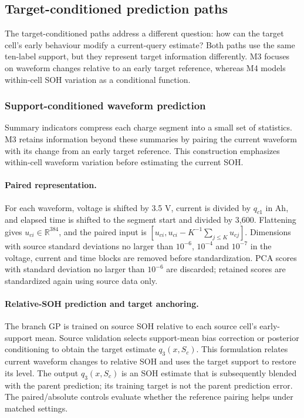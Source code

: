 \documentclass[preprint,12pt]{elsarticle}
\newcommand{\R}{\mathbb{R}}
\begin{document}
\subsection{Target-conditioned prediction paths}
The target-conditioned paths address a different question: how can the target cell's early behaviour modify a current-query estimate? Both paths use the same ten-label support, but they represent target information differently. M3 focuses on waveform changes relative to an early target reference, whereas M4 models within-cell SOH variation as a conditional function.
\subsubsection{Support-conditioned waveform prediction}
Summary indicators compress each charge segment into a small set of statistics. M3 retains information beyond these summaries by pairing the current waveform with its change from an early target reference. This construction emphasizes within-cell waveform variation before estimating the current SOH.

\paragraph{Paired representation.}
For each waveform, voltage is shifted by 3.5 V, current is divided by $q_{c1}$ in Ah, and elapsed time is shifted to the segment start and divided by 3,600. Flattening gives $u_{ci}\in\R^{384}$, and the paired input is $[u_{ci},u_{ci}-K^{-1}\sum_{j\leq K}u_{cj}]$. Dimensions with source standard deviations no larger than $10^{-6}$, $10^{-4}$ and $10^{-7}$ in the voltage, current and time blocks are removed before standardization. PCA scores with standard deviation no larger than $10^{-6}$ are discarded; retained scores are standardized again using source data only.

\paragraph{Relative-SOH prediction and target anchoring.}
The branch GP is trained on source SOH relative to each source cell's early-support mean. Source validation selects support-mean bias correction or posterior conditioning to obtain the target estimate $q_3(x,S_c)$. This formulation relates current waveform changes to relative SOH and uses the target support to restore its level. The output $q_3(x,S_c)$ is an SOH estimate that is subsequently blended with the parent prediction; its training target is not the parent prediction error. The paired/absolute controls evaluate whether the reference pairing helps under matched settings.
\end{document}
